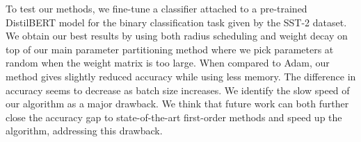 To test our methods, we
fine-tune a classifier attached to a pre-trained
DistilBERT model for the binary 
classification task given by the SST-2 dataset. 
We obtain
our best results by using 
both radius scheduling and weight decay on top of 
our main parameter partitioning method where we 
pick parameters at random when the weight matrix is 
too large. 
When compared to Adam, our method gives slightly reduced 
accuracy while using less memory. The difference in 
accuracy seems to decrease as batch size increases.
We identify the slow speed of our algorithm as 
a major drawback. We think that future 
work can both further close the accuracy gap to 
state-of-the-art first-order methods and 
speed up the algorithm, addressing this drawback.



